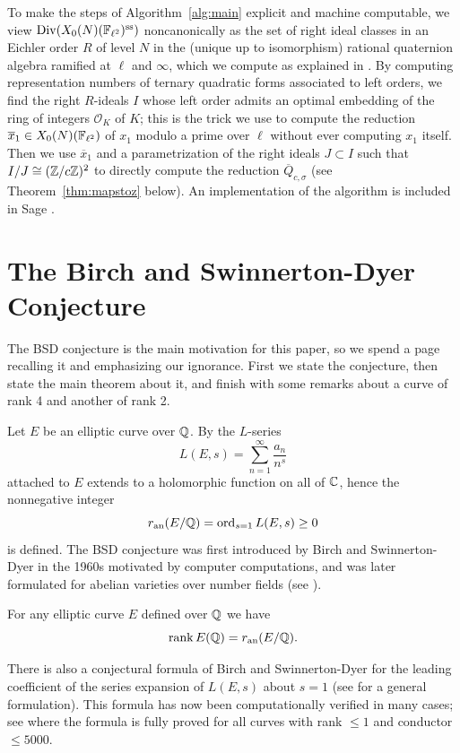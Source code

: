 \documentclass{article} \usepackage[active]{srcltx}
\newcommand{\Felltwo}{\F_{\ell^2}}
\renewcommand{\O}{\mathcal{O}}
\DeclareMathOperator{\supersingular}{ss}
\renewcommand{\ss}{\supersingular}
\begin{document}
To make the steps of Algorithm~\ref{alg:main} explicit and machine
computable, we view $\Div(X_0(N)(\F_{\ell^2})^{\ss})$ noncanonically
as the set of right ideal classes in an Eichler order $R$ of level $N$
in the (unique up to isomorphism) rational quaternion algebra ramified
at $\ell$ and $\infty$, which we compute as explained in
\cite{pizer:alg, kohel:hecke, kohel:computing, stein:modabvarnotes}.
By computing representation numbers of ternary quadratic forms
associated to left orders, we find the right $R$-ideals $I$ whose left
order admits an optimal embedding of the ring of integers $\O_K$ of
$K$; this is the trick we use to compute the reduction
$\overline{x}_1\in X_0(N)(\Felltwo)$ of $x_1$ modulo a prime over
$\ell$ without ever computing $x_1$ itself.  Then we use
$\overline{x}_1$ and a parametrization of the right ideals $J\subset
I$ such that $I/J\cong (\mathbb{Z}/c\mathbb{Z})^2$ to directly compute the reduction
$\overline{Q}_{c,\sigma}$ (see Theorem~\ref{thm:mapstoz} below).
An implementation of the algorithm is included in Sage \cite{sage}.



\section{The Birch and Swinnerton-Dyer Conjecture}\label{sec:bsd}
The BSD conjecture is the main motivation for this paper, so we spend
a page recalling it and emphasizing our ignorance.  First we state the
conjecture, then state the main theorem about it, and finish with some
remarks about a curve of rank 4 and another of rank 2.

Let $E$ be an elliptic curve over $\mathbb{Q}$.  By
\cite{breuil-conrad-diamond-taylor, wiles:fermat} the $L$-series
$$L(E,s) = \sum_{n=1}^{\infty} \frac{a_n}{n^s}$$ 
attached to $E$ extends to a holomorphic function on all of $\mathbb{C}$,
hence the nonnegative integer
$$
 r_{{\rm an}}(E/\mathbb{Q}) = \operatorname{ord}_{s=1} L(E,s) \geq 0
$$ 
is defined.  The BSD conjecture was first introduced by Birch and
Swinnerton-Dyer in the 1960s motivated by computer computations, and
was later formulated for abelian varieties over number fields (see
\cite{birch:edsac,birch:bsd,milne:bsdres,tate:bsd,wiles:cmi}).
\begin{conjecture}\label{conj:bsd} 
For any elliptic curve $E$ defined over $\mathbb{Q}$ we have
$$
  \operatorname{rank} E(\mathbb{Q}) = r_{{\rm an}}(E/\mathbb{Q}).
$$
\end{conjecture} 
There is also a conjectural formula of Birch and Swinnerton-Dyer for the leading
coefficient of the series expansion of $L(E,s)$ about $s=1$
(see \cite[III, \S 5]{lang:nt3} for a general formulation).
This formula has now been computationally verified in many cases; 
see \cite{bsdalg1, miller:bsd1} where the formula is fully proved for
all curves with rank $\leq 1$ and conductor $\leq 5000$.
\end{document}
